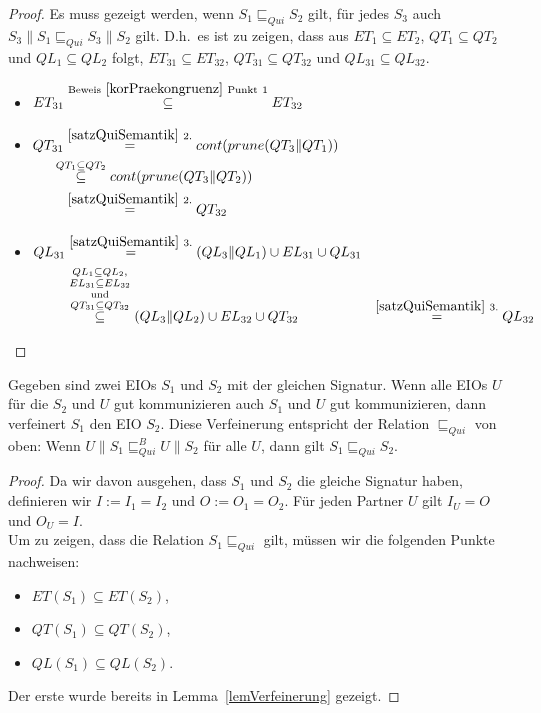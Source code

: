 \begin{proof}
  Es muss gezeigt werden, wenn $S_1\sqsubseteq _{Qui} S_2$ gilt,  für   jedes $
  S_3$ auch $S_3\|S_1\sqsubseteq _{Qui} S_3\|S_2$ gilt. D.h.\ es ist zu zeigen,
  dass aus $ET_1\subseteq ET_2$, $QT_1\subseteq QT_2$ und $QL_1\subseteq QL_2$
  folgt, $ET_{31}\subseteq ET_{32}$, $QT_{31}\subseteq QT_{32}$ und
  $QL_{31}\subseteq QL_{32}$.
  \begin{itemize}
    \item $\begin{aligned}[t]
        ET_{31} \overset{\mathrm{Beweis}~\ref{korPraekongruenz}
        ~\mathrm{Punkt}~1}{\subseteq} ET_{32}
    \end{aligned}$
    \item $\begin{aligned}[t]
        QT_{31} &\overset{\ref{satzQuiSemantik}~2.}{=} cont(prune(QT_3\|QT_1))\\
                &\hspace{-0.3cm}\overset{QT_1\subseteq QT_2}{\subseteq}
        cont(prune(QT_3\|QT_2))\\
                &\overset{\ref{satzQuiSemantik}~2.}{=} QT_{32}
    \end{aligned}$
    \item $\begin{aligned}[t]
        QL_{31} &\overset{\ref{satzQuiSemantik}~3.}{=} (QL_3\|QL_1)\cup EL_{31}
          \cup QL_{31}\\
        &\overset{QL_1 \subseteq QL_2,}{\overset{EL_{31}\subseteq
          EL_{32}}{\overset{\mathrm{und}}{\overset{QT_{31}\subseteq
          QT_{32}}{\subseteq}}}} (QL_3\|QL_2)\cup EL_{32}\cup QT_{32}
        &\overset{\ref{satzQuiSemantik}~3.}{=} QL_{32}
    \end{aligned}$
  \end{itemize}
\end{proof}

\begin{lem}
  Gegeben sind zwei EIOs $S_1$ und $S_2$ mit der gleichen Signatur. Wenn alle
  EIOs $U$ für die $S_2$ und $U$ gut kommunizieren auch $S_1$ und $U$ gut
  kommunizieren, dann verfeinert $S_1$ den EIO $S_2$. Diese Verfeinerung
  entspricht der Relation $\sqsubseteq _{Qui}$ von oben: Wenn
  $U\|S_1\sqsubseteq _{Qui}^B U\|S_2$ für alle $U$, dann gilt $S_1\sqsubseteq
  _{Qui} S_2$.
\end{lem}

\begin{proof}
  Da wir davon ausgehen, dass $S_1$ und $S_2$ die gleiche Signatur haben,
  definieren wir $I:=I_1=I_2$ und $O:=O_1=O_2$. Für jeden Partner $U$ gilt
  $I_U=O$ und $O_U=I$.\\
  Um zu zeigen, dass die Relation $S_1\sqsubseteq _{Qui}$ gilt, müssen wir die
  folgenden Punkte nachweisen:
  \begin{itemize}
    \item $ET(S_1)\subseteq ET(S_2)$,
    \item $QT(S_1)\subseteq QT(S_2)$,
    \item $QL(S_1)\subseteq QL(S_2)$.
  \end{itemize}
  Der erste wurde bereits in Lemma~\ref{lemVerfeinerung} gezeigt.
\end{proof}
